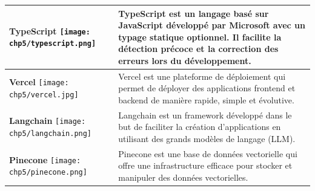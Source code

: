 \begin{longtable}{|p{4cm}|p{11cm}|}
    \hline
    \centering \textbf{TypeScript} \vspace{0.2cm} \newline \centering \texttt{[image: chp5/typescript.png]} & TypeScript est un langage basé sur JavaScript développé par Microsoft avec un typage statique optionnel. Il facilite la détection précoce et la correction des erreurs lors du développement. \\
    \hline
    \centering \textbf{Vercel} \vspace{0.2cm} \newline \centering \texttt{[image: chp5/vercel.jpg]} & Vercel est une plateforme de déploiement qui permet de déployer des applications frontend et backend de manière rapide, simple et évolutive. \\
    \hline
    \centering \textbf{Langchain} \vspace{0.2cm} \newline \centering \texttt{[image: chp5/langchain.png]} & Langchain est un framework développé dans le but de faciliter la création d'applications en utilisant des grands modèles de langage (LLM). \\
    \hline
    \centering \textbf{Pinecone} \vspace{0.2cm} \newline \centering \texttt{[image: chp5/pinecone.png]} & Pinecone est une base de données vectorielle qui offre une infrastructure efficace pour stocker et manipuler des données vectorielles. \\
    \hline
\end{longtable}

